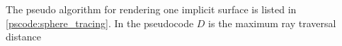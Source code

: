 The pseudo algorithm for rendering one implicit surface is listed in \autoref{pscode:sphere_tracing}.
In the pseudocode $D$ is the maximum ray traversal distance 














